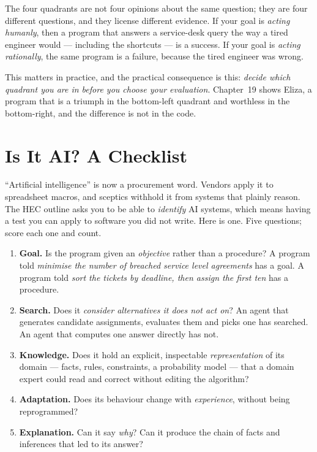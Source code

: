 \begin{conceptbox}
The four quadrants are not four opinions about the same question; they are four
different questions, and they license different evidence. If your goal is
\emph{acting humanly}, then a program that answers a service-desk query the way a
tired engineer would --- including the shortcuts --- is a success. If your goal is
\emph{acting rationally}, the same program is a failure, because the tired
engineer was wrong.

This matters in practice, and the practical consequence is this: \emph{decide
which quadrant you are in before you choose your evaluation}. Chapter~19 shows
Eliza, a program that is a triumph in the bottom-left quadrant and worthless in
the bottom-right, and the difference is not in the code.
\end{conceptbox}

\section{Is It AI? A Checklist}
\label{sec:is-it-ai}

``Artificial intelligence'' is now a procurement word. Vendors apply it to
spreadsheet macros, and sceptics withhold it from systems that plainly reason. The
HEC outline asks you to be able to \emph{identify} AI systems, which means having
a test you can apply to software you did not write. Here is one. Five questions;
score each one and count.

\begin{enumerate}[leftmargin=2.2em, itemsep=3pt, topsep=4pt]
  \item \textbf{Goal.} Is the program given an \emph{objective} rather than a
        procedure? A program told \emph{minimise the number of breached service
        level agreements} has a goal. A program told \emph{sort the tickets by
        deadline, then assign the first ten} has a procedure.
  \item \textbf{Search.} Does it \emph{consider alternatives it does not act on}?
        An agent that generates candidate assignments, evaluates them and picks
        one has searched. An agent that computes one answer directly has not.
  \item \textbf{Knowledge.} Does it hold an explicit, inspectable
        \emph{representation} of its domain --- facts, rules, constraints, a
        probability model --- that a domain expert could read and correct without
        editing the algorithm?
  \item \textbf{Adaptation.} Does its behaviour change with \emph{experience},
        without being reprogrammed?
  \item \textbf{Explanation.} Can it say \emph{why}? Can it produce the chain of
        facts and inferences that led to its answer?
\end{enumerate}

